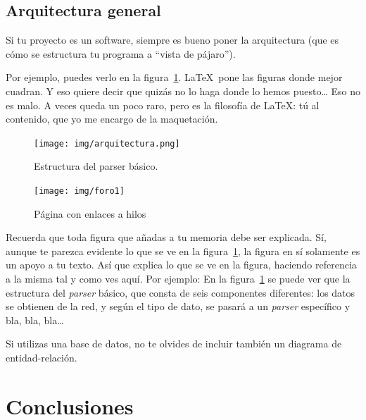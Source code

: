 \documentclass[a4paper, 12pt]{book}
\begin{document}
\section{Arquitectura general} 
\label{sec:arquitectura}

Si tu proyecto es un software, siempre es bueno poner la arquitectura (que es cómo se estructura tu programa a ``vista de pájaro'').

Por ejemplo, puedes verlo en la figura~\ref{fig:arquitectura}.
\LaTeX \ pone las figuras donde mejor cuadran. 
Y eso quiere decir que quizás no lo haga donde lo hemos puesto\ldots
Eso no es malo.
A veces queda un poco raro, pero es la filosofía de \LaTeX: tú al contenido, que yo me encargo de la maquetación.

\begin{figure}
  \centering
  \texttt{[image: img/arquitectura.png]}
  \caption{Estructura del parser básico.}\label{fig:arquitectura}
\end{figure}

\begin{figure}
    \centering
    \texttt{[image: img/foro1]}
    \caption{Página con enlaces a hilos}\label{fig:_arquitectura}
\end{figure}

 
Recuerda que toda figura que añadas a tu memoria debe ser explicada.
Sí, aunque te parezca evidente lo que se ve en la figura~\ref{fig:arquitectura}, la figura en sí solamente es un apoyo a tu texto.
Así que explica lo que se ve en la figura, haciendo referencia a la misma tal y como ves aquí.
Por ejemplo: En la figura~\ref{fig:arquitectura} se puede ver que la estructura del \emph{parser} básico, que consta de seis componentes diferentes: los datos se obtienen de la red, y según el tipo de dato, se pasará a un \emph{parser} específico y bla, bla, bla\ldots

Si utilizas una base de datos, no te olvides de incluir también un diagrama de entidad-relación.




\cleardoublepage
\chapter{Conclusiones}
\label{chap:conclusiones}
\end{document}
